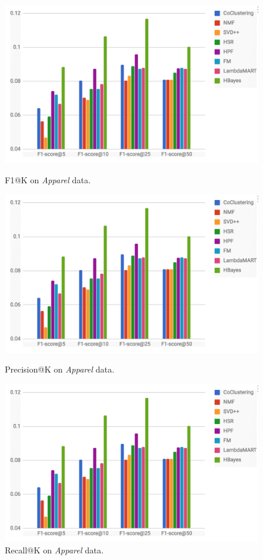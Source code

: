 \begin{figure}[!htb]
  \includegraphics[width=\linewidth]{fig/test}
  \caption{F1@K on \emph{Apparel} data.}\label{fig:awesome_image1}
\endminipage\hfill
{}
  \includegraphics[width=\linewidth]{fig/test}
  \caption{Precision@K on \emph{Apparel} data.}\label{fig:awesome_image2}
\endminipage\hfill
{}%
  \includegraphics[width=\linewidth]{fig/test}
  \caption{Recall@K on \emph{Apparel} data.}\label{fig:awesome_image3}
\endminipage
\end{figure}


